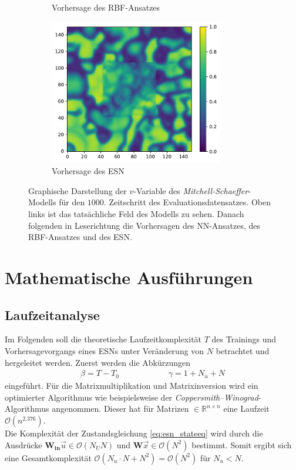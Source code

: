 \begin{appendices}
\begin{figure}[h]
\begin{subfigure}{.5\textwidth}
		\setcapmargin[1cm]{0.5cm}
  		\caption{Vorhersage des \textsc{RBF}-Ansatzes}
	\end{subfigure}%
	\begin{subfigure}{.5\textwidth}
		\centering
		\includegraphics[height=2.5in]{figures/results/inner_cross_prediction/mitchell_v_inner_esn.pdf}
		\setcapmargin[1cm]{0.5cm}
  		\caption{Vorhersage des \textsc{ESN}}
	\end{subfigure}
	\caption{Graphische Darstellung der $v$-Variable des \textit{Mitchell-Schaeffer}-Modells für den $1000$. Zeitschritt des Evaluationsdatensatzes. Oben links ist das tatsächliche Feld des Modells zu sehen. Danach folgenden in Leserichtung die Vorhersagen des \textsc{NN}-Ansatzes, des \textsc{RBF}-Ansatzes und des \textsc{ESN}.}
	\label{fig:apx_inner_cross_mitchell_result}
\end{figure} 

\end{appendices}


\chapter{Mathematische Ausführungen}
\section{Laufzeitanalyse}
Im Folgenden soll die theoretische Laufzeitkomplexität $T$ des Trainings und Vorhersagevorgangs eines \textsc{ESN}s unter Veränderung von $N$ betrachtet und hergeleitet werden.
Zuerst werden die Abkürzungen
\begin{align*}
\beta = T-T_{0} \qquad\qquad\qquad \gamma = 1+N_u+N
\end{align*}
eingeführt. Für die Matrixmultiplikation und Matrixinversion wird ein optimierter Algorithmus wie beispielsweise der \textit{Coppersmith–Winograd}-Algorithmus angenommen. Dieser hat für Matrizen $\in \mathbb{R}^{n \times n}$ eine Laufzeit $\mathcal{O}(n^{2.376})$. \\
Die Komplexität der Zustandsgleichung \ref{eq:esn_stateeq} wird durch die Ausdrücke $\mathbf{W_{in}} \vec{u} \in \mathcal{O}(N_U N)$ und $\mathbf{W}\vec{x} \in \mathcal{O}(N^2)$ bestimmt. Somit ergibt sich eine Gesamtkomplexität $\mathcal{O}(N_u \cdot N + N^2) = \mathcal{O}(N^2)$ für $N_u < N$.\\

